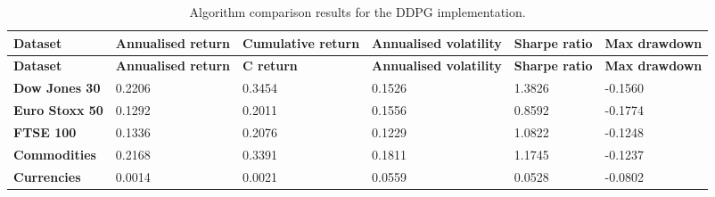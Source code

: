 \begin{longtable}{|l|p{2.1cm}|p{2.1cm}|p{2.1cm}|p{1.5cm}|p{2cm}|}
    \caption{Algorithm comparison results for the DDPG implementation.}
    \label{tab:experiment_algorithms_ddpg}
    \\ 
    \hline
    \textbf{Dataset} & \textbf{Annualised return} & \textbf{Cumulative return} & \textbf{Annualised volatility} & \textbf{Sharpe ratio} & \textbf{Max drawdown}  \\ \midrule
    \endfirsthead

    \hline
    \textbf{Dataset} & \textbf{Annualised return} & \textbf{C return} & \textbf{Annualised volatility} & \textbf{Sharpe ratio} & \textbf{Max drawdown}  \\ \midrule
    \endhead

    \endfoot
    \hline

    \textbf{Dow Jones 30} & 0.2206 & 0.3454 & 0.1526 & 1.3826 & -0.1560 \\ \hline
    \textbf{Euro Stoxx 50} & 0.1292 & 0.2011 & 0.1556 & 0.8592 & -0.1774 \\ \hline
    \textbf{FTSE 100} & 0.1336 & 0.2076 & 0.1229 & 1.0822 & -0.1248 \\ \hline
    \textbf{Commodities} & 0.2168 & 0.3391 & 0.1811 & 1.1745 & -0.1237 \\ \hline
    \textbf{Currencies} & 0.0014 & 0.0021 & 0.0559 & 0.0528 & -0.0802 \\ \hline
\end{longtable}
